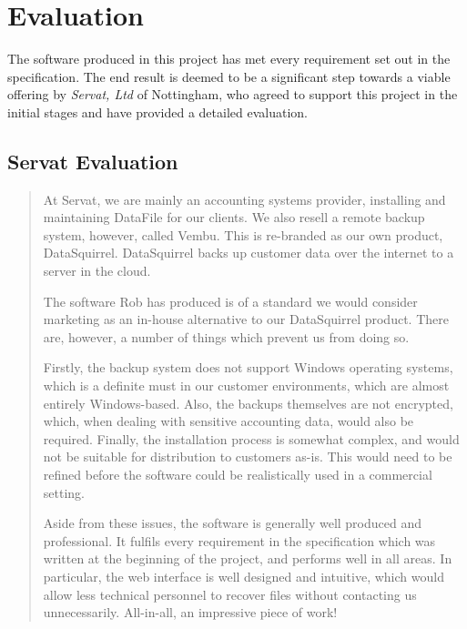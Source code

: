 \chapter{Evaluation}

The software produced in this project has met every requirement set out in the
specification. The end result is deemed to be a significant step towards
a viable offering by \emph{Servat, Ltd} of Nottingham, who agreed to support
this project in the initial stages and have provided a detailed evaluation.

\section{Servat Evaluation}

\begin{quote}
\begin{em}

    At Servat, we are mainly an accounting systems provider, installing and
    maintaining DataFile for our clients. We also resell a remote backup
    system, however, called Vembu. This is re-branded as our own product,
    DataSquirrel. DataSquirrel backs up customer data over the internet to
    a server in the cloud.

    The software Rob has produced is of a standard we would consider marketing
    as an in-house alternative to our DataSquirrel product. There are, however,
    a number of things which prevent us from doing so.
    
    Firstly, the backup system does not support Windows operating systems,
    which is a definite must in our customer environments, which are almost
    entirely Windows-based. Also, the backups themselves are not encrypted,
    which, when dealing with sensitive accounting data, would also be required.
    Finally, the installation process is somewhat complex, and would not be
    suitable for distribution to customers as-is. This would need to be refined
    before the software could be realistically used in a commercial setting.

    Aside from these issues, the software is generally well produced and
    professional. It fulfils every requirement in the specification which was
    written at the beginning of the project, and performs well in all areas. In
    particular, the web interface is well designed and intuitive, which would
    allow less technical personnel to recover files without contacting us
    unnecessarily. All-in-all, an impressive piece of work!

\end{em}
\end{quote}

